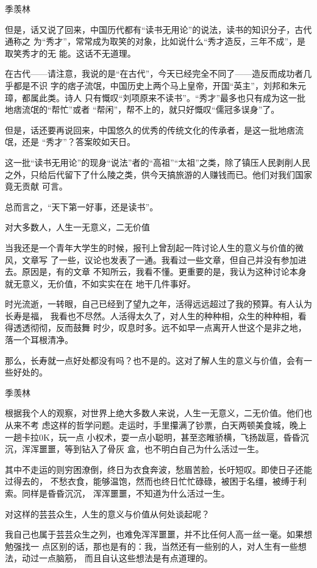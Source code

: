 \documentclass[11pt]{ctexart}
\begin{document}
{{{{季羡林

但是，话又说了回来，中国历代都有“读书无用论”的说法，读书的知识分子，古代通称之
为“秀才”，常常成为取笑的对象，比如说什么“秀才造反，三年不成”，是取笑秀才的无
能。这话不无道理。

在古代——请注意，我说的是“在古代”，今天已经完全不同了——造反而成功者几乎都是不识
字的痞子流氓，中国历史上两个马上皇帝，开国“英主”，刘邦和朱元璋，都属此类。诗人
只有慨叹“刘项原来不读书”。“秀才”最多也只有成为这一批地痞流氓的“帮忙”或者
“帮闲”，帮不上的，就只好慨叹“儒冠多误身”了。

但是，话还要再说回来，中国悠久的优秀的传统文化的传承者，是这一批地痞流氓，还是
“秀才”？答案皎如天日。

这一批“读书无用论”的现身“说法”者的“高祖”“太祖”之类，除了镇压人民剥削人民
之外，只给后代留下了什么陵之类，供今天搞旅游的人赚钱而已。他们对我们国家竟无贡献
可言。

总而言之，“天下第一好事，还是读书”。

对大多数人，人生一无意义，二无价值

当我还是一个青年大学生的时候，报刊上曾刮起一阵讨论人生的意义与价值的微风，文章写
了一些，议论也发表了一通。我看过一些文章，但自己并没有参加进去。原因是，有的文章
不知所云，我看不懂。更重要的是，我认为这种讨论本身就无意义，无价值，不如实实在在
地干几件事好。

时光流逝，一转眼，自己已经到了望九之年，活得远远超过了我的预算。有人认为长寿是福，
我看也不尽然。人活得太久了，对人生的种种相，众生的种种相，看得透透彻彻，反而鼓舞
时少，叹息时多。远不如早一点离开人世这个是非之地，落一个耳根清净。

那么，长寿就一点好处都没有吗？也不是的。这对了解人生的意义与价值，会有一些好处的。



季羡林

根据我个人的观察，对世界上绝大多数人来说，人生一无意义，二无价值。他们也从来不考
虑这样的哲学问题。走运时，手里攥满了钞票，白天两顿美食城，晚上一趟卡拉0K，玩一点
小权术，耍一点小聪明，甚至恣睢骄横，飞扬跋扈，昏昏沉沉，浑浑噩噩，等到钻入了骨灰
盒，也不明白自己为什么活过一生。

其中不走运的则穷困潦倒，终日为衣食奔波，愁眉苦脸，长吁短叹。即使日子还能过得去的，
不愁衣食，能够温饱，然而也终日忙忙碌碌，被困于名缰，被缚于利索。同样是昏昏沉沉，
浑浑噩噩，不知道为什么活过一生。

对这样的芸芸众生，人生的意义与价值从何处谈起呢？

我自己也属于芸芸众生之列，也难免浑浑噩噩，并不比任何人高一丝一毫。如果想勉强找一
点区别的话，那也是有的：我，当然还有一些别的人，对人生有一些想法，动过一点脑筋，
而且自认这些想法是有点道理的。

}}}}
\end{document}
